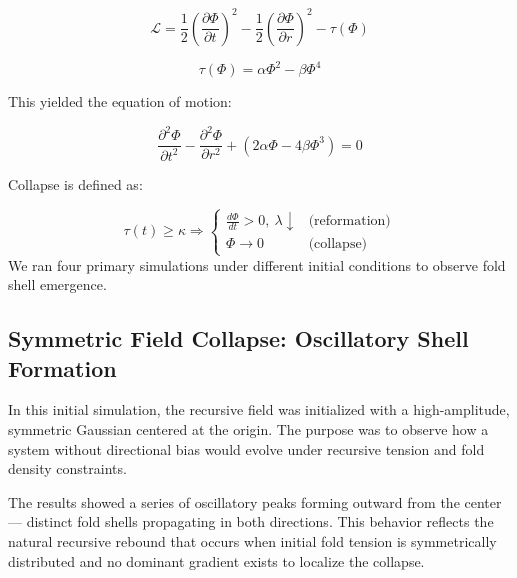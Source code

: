 \documentclass[12pt]{article}
\begin{document}
\begin{equation}
\mathcal{L} = \frac{1}{2} \left( \frac{\partial \Phi}{\partial t} \right)^2 - \frac{1}{2} \left( \frac{\partial \Phi}{\partial r} \right)^2 - \tau(\Phi)
\end{equation}

\begin{equation}
\tau(\Phi) = \alpha \Phi^2 - \beta \Phi^4
\end{equation}

This yielded the equation of motion:

\begin{equation}
\frac{\partial^2 \Phi}{\partial t^2} - \frac{\partial^2 \Phi}{\partial r^2} + (2\alpha \Phi - 4\beta \Phi^3) = 0
\end{equation}

\begin{minipage}{\textwidth}
Collapse is defined as:

\begin{equation}
\tau(t) \geq \kappa \Rightarrow
\begin{cases}
\frac{d\Phi}{dt} > 0,\ \lambda \downarrow & \text{(reformation)} \\
\Phi \rightarrow 0 & \text{(collapse)}
\end{cases}
\end{equation}
We ran four primary simulations under different initial conditions to observe fold shell emergence.
\end{minipage}
\subsection{Symmetric Field Collapse: Oscillatory Shell Formation}

In this initial simulation, the recursive field was initialized with a high-amplitude, symmetric Gaussian centered at the origin. The purpose was to observe how a system without directional bias would evolve under recursive tension and fold density constraints.

The results showed a series of oscillatory peaks forming outward from the center — distinct fold shells propagating in both directions. This behavior reflects the natural recursive rebound that occurs when initial fold tension is symmetrically distributed and no dominant gradient exists to localize the collapse.
\end{document}
